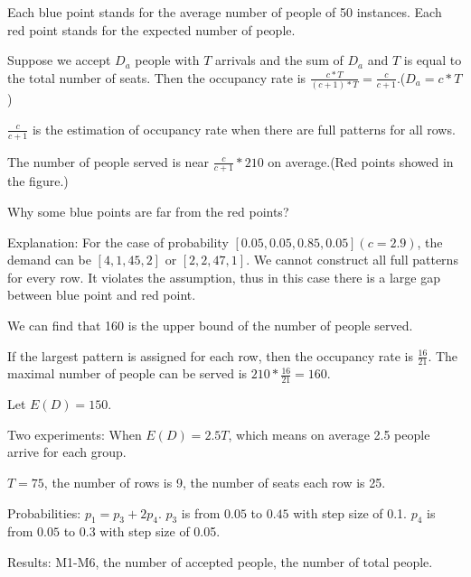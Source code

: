 Each blue point stands for the average number of people of 50 instances.
Each red point stands for the expected number of people.

Suppose we accept $D_a$ people with $T$ arrivals and the sum of $D_a$ and $T$ is equal to the total number of seats. Then the occupancy rate is $\frac{c * T}{(c+1) * T}= \frac{c}{c+1}$.($D_a = c * T$)

$\frac{c}{c+1}$ is the estimation of occupancy rate when there are full patterns for all rows.

The number of people served is near $\frac{c}{c+1} * 210$ on average.(Red points showed in the figure.) 

Why some blue points are far from the red points? 

Explanation:
For the case of probability $[0.05, 0.05, 0.85, 0.05](c =2.9)$, the demand can be $[4, 1, 45, 2]$ or $[2, 2, 47, 1]$. We cannot construct all full patterns for every row. It violates the assumption, thus in this case there is a large gap between blue point and red point.

We can find that 160 is the upper bound of the number of people served. 

If the largest pattern is assigned for each row, then the occupancy rate is $\frac{16}{21}$. The maximal number of people can be served is $210 * \frac{16}{21} =160$. 





\newpage

Let $E(D) = 150$.

Two experiments:
When $E(D) = 2.5T$, which means on average 2.5 people arrive for each group.

$T =75$, the number of rows is 9, the number of seats each row is 25.

Probabilities: 
$p_1 = p_3 + 2p_4$. $p_3$ is from $0.05$ to $0.45$ with step size of 0.1. $p_4$ is from $0.05$ to $0.3$ with step size of 0.05.

Results: M1-M6, the number of accepted people, the number of total people.

